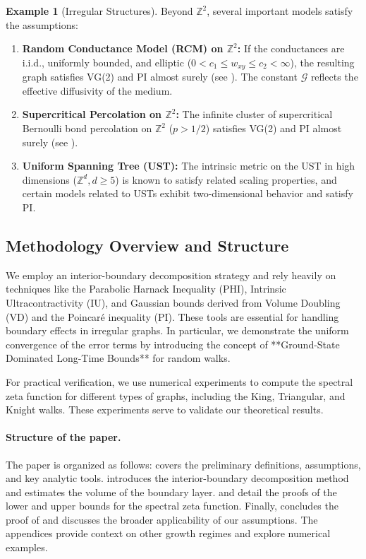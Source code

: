 \documentclass[12pt]{amsart}
\theoremstyle{definition}
\newtheorem{example}[theorem]{Example}
\theoremstyle{remark}
\newcommand{\cG}{\mathcal{G}}    %
\begin{document}
\begin{example}[Irregular Structures]\label{ex:irregular}
Beyond $\mathbb{Z}^2$, several important models satisfy the assumptions:
\begin{enumerate}
    \item \textbf{Random Conductance Model (RCM) on $\mathbb{Z}^2$:} If the conductances are i.i.d., uniformly bounded, and elliptic ($0 < c_1 \leq w_{xy} \leq c_2 < \infty$), the resulting graph satisfies VG(2) and PI almost surely (see \cite{Biskup11}). The constant $\cG$ reflects the effective diffusivity of the medium.
    \item \textbf{Supercritical Percolation on $\mathbb{Z}^2$:} The infinite cluster of supercritical Bernoulli bond percolation on $\mathbb{Z}^2$ ($p>1/2$) satisfies VG(2) and PI almost surely (see \cite{Barlow04}).
    \item \textbf{Uniform Spanning Tree (UST):} The intrinsic metric on the UST in high dimensions ($\mathbb{Z}^d, d\geq 5$) is known to satisfy related scaling properties, and certain models related to USTs exhibit two-dimensional behavior and satisfy PI.
\end{enumerate}
\end{example}


\subsection{Methodology Overview and Structure}
We employ an interior-boundary decomposition strategy and rely heavily on techniques like the Parabolic Harnack Inequality (PHI), Intrinsic Ultracontractivity (IU), and Gaussian bounds derived from Volume Doubling (VD) and the Poincaré inequality (PI). These tools are essential for handling boundary effects in irregular graphs. In particular, we demonstrate the uniform convergence of the error terms by introducing the concept of **Ground-State Dominated Long-Time Bounds** for random walks.

For practical verification, we use numerical experiments to compute the spectral zeta function for different types of graphs, including the King, Triangular, and Knight walks. These experiments serve to validate our theoretical results.

\paragraph{Structure of the paper.} 
The paper is organized as follows:
 covers the preliminary definitions, assumptions, and key analytic tools.  introduces the interior-boundary decomposition method and estimates the volume of the boundary layer.  and  detail the proofs of the lower and upper bounds for the spectral zeta function. Finally,  concludes the proof of  and discusses the broader applicability of our assumptions. The appendices provide context on other growth regimes and explore numerical examples.
\end{document}
